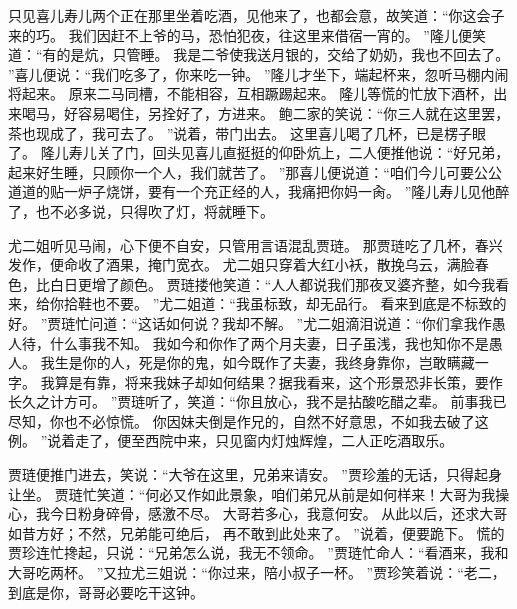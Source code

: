 只见喜儿寿儿两个正在那里坐着吃酒，见他来了，也都会意，故笑道：“你这会子来的巧。
我们因赶不上爷的马，恐怕犯夜，往这里来借宿一宵的。
”隆儿便笑道：“有的是炕，只管睡。
我是二爷使我送月银的，交给了奶奶，我也不回去了。
”喜儿便说：“我们吃多了，你来吃一钟。
”隆儿才坐下，端起杯来，忽听马棚内闹将起来。
原来二马同槽，不能相容，互相蹶踢起来。
隆儿等慌的忙放下酒杯，出来喝马，好容易喝住，另拴好了，方进来。
鲍二家的笑说：“你三人就在这里罢，茶也现成了，我可去了。
”说着，带门出去。
这里喜儿喝了几杯，已是楞子眼了。
隆儿寿儿关了门，回头见喜儿直挺挺的仰卧炕上，二人便推他说：“好兄弟，起来好生睡，只顾你一个人，我们就苦了。
”那喜儿便说道：“咱们今儿可要公公道道的贴一炉子烧饼，要有一个充正经的人，我痛把你妈一肏。
”隆儿寿儿见他醉了，也不必多说，只得吹了灯，将就睡下。
\par
尤二姐听见马闹，心下便不自安，只管用言语混乱贾琏。
那贾琏吃了几杯，春兴发作，便命收了酒果，掩门宽衣。
尤二姐只穿着大红小袄，散挽乌云，满脸春色，比白日更增了颜色。
贾琏搂他笑道：“人人都说我们那夜叉婆齐整，如今我看来，给你拾鞋也不要。
”尤二姐道：“我虽标致，却无品行。
看来到底是不标致的好。
”贾琏忙问道：“这话如何说？我却不解。
”尤二姐滴泪说道：“你们拿我作愚人待，什么事我不知。
我如今和你作了两个月夫妻，日子虽浅，我也知你不是愚人。
我生是你的人，死是你的鬼，如今既作了夫妻，我终身靠你，岂敢瞒藏一字。
我算是有靠，将来我妹子却如何结果？据我看来，这个形景恐非长策，要作长久之计方可。
”贾琏听了，笑道：“你且放心，我不是拈酸吃醋之辈。
前事我已尽知，你也不必惊慌。
你因妹夫倒是作兄的，自然不好意思，不如我去破了这例。
”说着走了，便至西院中来，只见窗内灯烛辉煌，二人正吃酒取乐。
\par
贾琏便推门进去，笑说：“大爷在这里，兄弟来请安。
”贾珍羞的无话，只得起身让坐。
贾琏忙笑道：“何必又作如此景象，咱们弟兄从前是如何样来！大哥为我操心，我今日粉身碎骨，感激不尽。
大哥若多心，我意何安。
从此以后，还求大哥如昔方好；不然，兄弟能可绝后，
再不敢到此处来了。
”说着，便要跪下。
慌的贾珍连忙搀起，只说：“兄弟怎么说，我无不领命。
”贾琏忙命人：“看酒来，我和大哥吃两杯。
”又拉尤三姐说：“你过来，陪小叔子一杯。
”贾珍笑着说：“老二，到底是你，哥哥必要吃干这钟。
